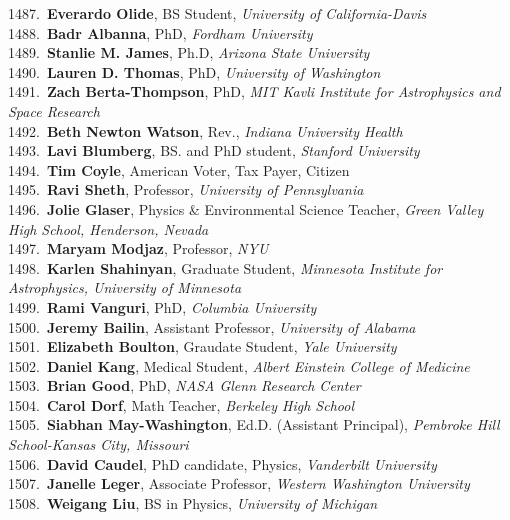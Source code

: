 1487.~{\bf Everardo Olide}, BS Student, {\sl University of California-Davis} \\
1488.~{\bf Badr Albanna}, PhD, {\sl Fordham University} \\
1489.~{\bf Stanlie M. James}, Ph.D, {\sl Arizona State University} \\
1490.~{\bf Lauren D. Thomas}, PhD, {\sl University of Washington} \\
1491.~{\bf Zach Berta-Thompson}, PhD, {\sl MIT Kavli Institute for Astrophysics and Space Research} \\
1492.~{\bf Beth Newton Watson}, Rev., {\sl Indiana University Health} \\
1493.~{\bf Lavi Blumberg}, BS. and PhD student, {\sl Stanford University } \\
1494.~{\bf Tim Coyle}, American Voter, Tax Payer, Citizen \\
1495.~{\bf Ravi Sheth}, Professor, {\sl University of Pennsylvania} \\
1496.~{\bf Jolie Glaser}, Physics \& Environmental Science Teacher, {\sl Green Valley High School, Henderson, Nevada} \\
1497.~{\bf Maryam Modjaz}, Professor, {\sl NYU} \\
1498.~{\bf Karlen Shahinyan}, Graduate Student, {\sl Minnesota Institute for Astrophysics, University of Minnesota} \\
1499.~{\bf Rami Vanguri}, PhD, {\sl Columbia University} \\
1500.~{\bf Jeremy Bailin}, Assistant Professor, {\sl University of Alabama} \\
1501.~{\bf Elizabeth Boulton}, Graudate Student, {\sl Yale University} \\
1502.~{\bf Daniel Kang}, Medical Student, {\sl Albert Einstein College of Medicine} \\
1503.~{\bf Brian Good}, PhD, {\sl NASA Glenn Research Center} \\
1504.~{\bf Carol Dorf}, Math Teacher, {\sl Berkeley High School} \\
1505.~{\bf Siabhan May-Washington}, Ed.D. (Assistant Principal), {\sl Pembroke Hill School-Kansas City, Missouri} \\
1506.~{\bf David Caudel}, PhD candidate, Physics, {\sl Vanderbilt University} \\
1507.~{\bf Janelle Leger}, Associate Professor, {\sl Western Washington University} \\
1508.~{\bf Weigang Liu}, BS in Physics, {\sl University of Michigan } \\
